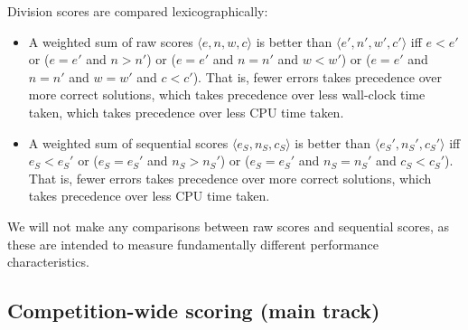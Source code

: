 \documentclass[12pt]{article}
\begin{document}
Division scores are compared lexicographically:
\begin{itemize}
\item A weighted sum of raw scores $\langle e, n, w, c\rangle$ is
  better than $\langle e', n', w', c'\rangle$ iff $e < e'$ or ($e =
  e'$ and $n > n'$) or ($e = e'$ and $n = n'$ and $w < w'$) or ($e =
  e'$ and $n = n'$ and $w = w'$ and $c < c'$).  That is, fewer errors
  takes precedence over more correct solutions, which takes precedence
  over less wall-clock time taken, which takes precedence over less
  CPU time taken.
\item A weighted sum of sequential scores $\langle e_S, n_S,
  c_S\rangle$ is better than $\langle e_S', n_S', c_S'\rangle$ iff
  $e_S < e_S'$ or ($e_S = e_S'$ and $n_S > n_S'$) or ($e_S = e_S'$ and
  $n_S = n_S'$ and $c_S < c_S'$).  That is, fewer errors takes
  precedence over more correct solutions, which takes precedence over
  less CPU time taken.
\end{itemize}
%
We will not make any comparisons between raw scores and sequential
scores, as these are intended to measure fundamentally different
performance characteristics.

\subsection{Competition-wide scoring (main track)}
\label{sec:competition-wide}
\end{document}

